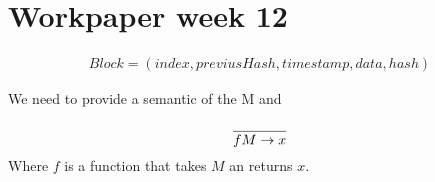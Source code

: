 

\author{Group D608F16}
\title{}



\maketitle

\section{Workpaper week 12}

\begin{align*}
Block = (index, previusHash, timestamp, data, hash)
\end{align*}
\citep{Meredith2005}

We need to provide a semantic of the M and 

\begin{align*}
\dfrac{}{fM \rightarrow x} 
\end{align*}
Where $f$ is a function that takes $M$ an returns $x$.






\grid
\grids
